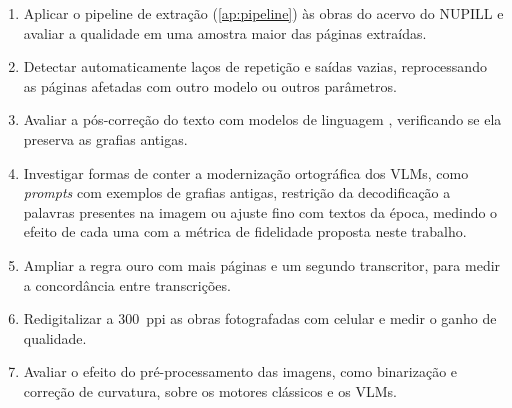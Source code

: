 \documentclass[noabntexcite,oneside]{ufsc-thesis-rn46-2019}
\begin{document}
\begin{enumerate}
    \item Aplicar o pipeline de extração (\autoref{ap:pipeline}) às obras do acervo do
    NUPILL e avaliar a qualidade em uma amostra maior das páginas extraídas.

    \item Detectar automaticamente laços de repetição e saídas vazias, reprocessando as
    páginas afetadas com outro modelo ou outros parâmetros.

    \item Avaliar a pós-correção do texto com modelos de linguagem \cite{fritzen2025},
    verificando se ela preserva as grafias antigas.

    \item Investigar formas de conter a modernização ortográfica dos VLMs, como
    \textit{prompts} com exemplos de grafias antigas, restrição da decodificação a
    palavras presentes na imagem ou ajuste fino com textos da época, medindo o efeito de
    cada uma com a métrica de fidelidade proposta neste trabalho.

    \item Ampliar a regra ouro com mais páginas e um segundo transcritor, para medir a
    concordância entre transcrições.

        \item Redigitalizar a 300~ppi as obras fotografadas com celular e medir o ganho de
    qualidade.

    \item Avaliar o efeito do pré-processamento das imagens, como binarização e correção
    de curvatura, sobre os motores clássicos e os VLMs.
\end{enumerate}

\postextual


\end{document}
